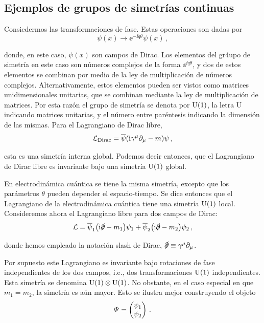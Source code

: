 \subsection{Ejemplos de grupos de simetrías continuas}

Consiedermos las transformaciones de fase. Estas operaciones son dadas por
%
\begin{equation}
	\psi(x) \rightarrow \ee^{-\ii q \theta} \psi(x) \,,
\end{equation}

\noindent donde, en este caso, $\psi(x)$ son campos de Dirac. Los elementos del gr4upo de simetría en este caso son números complejos de la forma $\ee^{\ii q \theta}$, y dos de estos elementos se combinan por medio de la ley de multiplicación de números complejos. Alternativamente, estos elementos pueden ser vistos como matrices unidimensionales unitarias, que se combinan mediante la ley de multiplicación de matrices. Por esta razón el grupo de simetría se denota por $\mathrm{U}(1)$, la letra U indicando matrices unitarias, y el número entre paréntesis indicando la dimensión de las mismas. Para el Lagrangiano de Dirac libre,
%
\begin{equation}
	\mathcal{L}_{\text{Dirac}} = \overline{\psi} \qty(\mathrm{i} \gamma^\mu \partial_\mu - m)\psi \,,
\end{equation}

\noindent esta es una simetría interna global. Podemos decir entonces, que el Lagrangiano de Dirac libre es invariante bajo una simetría $\mathrm{U}(1)$ global.

En electrodinámica cuántica se tiene la misma simetría, excepto que los parámetros $\theta$ pueden depender el espacio-tiempo. Se dice entonces que el Lagrangiano de la electrodinámica cuántica tiene una simetría $\mathrm{U}(1)$ local. \\


Consideremos ahora el Lagrangiano libre para dos campos de Dirac:
%
\begin{equation}
	\mathcal{L} = \overline{\psi}_1 \qty(\mathrm{i} \slashed{\partial} - m_1)\psi_1 + \overline{\psi}_2 \qty(\mathrm{i} \slashed{\partial} - m_2)\psi_2 \,,
\label{eq:LagnDiracLibre_dosCampos}
\end{equation}

\noindent donde hemos empleado la notación slash de Dirac, $\slashed{\partial} \equiv \gamma^\mu \partial_\mu$.

Por supuesto este Lagrangiano es invariante bajo rotaciones de fase independientes de los dos campos, i.e., dos transformaciones $\mathrm{U}(1)$ independientes. Esta simetría se denomina $\mathrm{U}(1) \otimes \mathrm{U}(1)$. No obstante, en el caso especial en que $m_1 = m_2$, la simetría es aún mayor. Esto se ilustra mejor construyendo el objeto
%
\begin{equation}
	\varPsi = \pmqty{\psi_1 \\ \psi_2}\,.
\end{equation}

